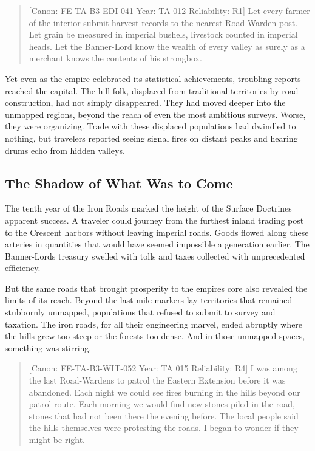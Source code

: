 \begin{quote}
{[}Canon: FE-TA-B3-EDI-041 \textbar{} Year: TA 012 \textbar{}
Reliability: R1{]} Let every farmer of the interior submit harvest
records to the nearest Road-Warden post. Let grain be measured in
imperial bushels, livestock counted in imperial heads. Let the
Banner-Lord know the wealth of every valley as surely as a merchant
knows the contents of his strongbox.
\end{quote}

Yet even as the empire celebrated its statistical achievements,
troubling reports reached the capital. The hill-folk, displaced from
traditional territories by road construction, had not simply
disappeared. They had moved deeper into the unmapped regions, beyond the
reach of even the most ambitious surveys. Worse, they were organizing.
Trade with these displaced populations had dwindled to nothing, but
travelers reported seeing signal fires on distant peaks and hearing
drums echo from hidden valleys.

\subsection{The Shadow of What Was to
Come}\label{the-shadow-of-what-was-to-come}

The tenth year of the Iron Roads marked the height of the Surface
Doctrine\textquotesingle s apparent success. A traveler could journey
from the furthest inland trading post to the Crescent harbors without
leaving imperial roads. Goods flowed along these arteries in quantities
that would have seemed impossible a generation earlier. The
Banner-Lord\textquotesingle s treasury swelled with tolls and taxes
collected with unprecedented efficiency.

But the same roads that brought prosperity to the
empire\textquotesingle s core also revealed the limits of its reach.
Beyond the last mile-markers lay territories that remained stubbornly
unmapped, populations that refused to submit to survey and taxation. The
iron roads, for all their engineering marvel, ended abruptly where the
hills grew too steep or the forests too dense. And in those unmapped
spaces, something was stirring.

\begin{quote}
{[}Canon: FE-TA-B3-WIT-052 \textbar{} Year: TA 015 \textbar{}
Reliability: R4{]} I was among the last Road-Wardens to patrol the
Eastern Extension before it was abandoned. Each night we could see fires
burning in the hills beyond our patrol route. Each morning we would find
new stones piled in the road, stones that had not been there the evening
before. The local people said the hills themselves were protesting the
roads. I began to wonder if they might be right.
\end{quote}

